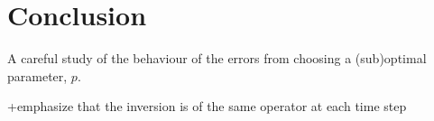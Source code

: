 \chapter{Conclusion}

A careful study of the behaviour of the errors from choosing a (sub)optimal parameter, $p$.


+emphasize that the inversion is of the same operator at each time step